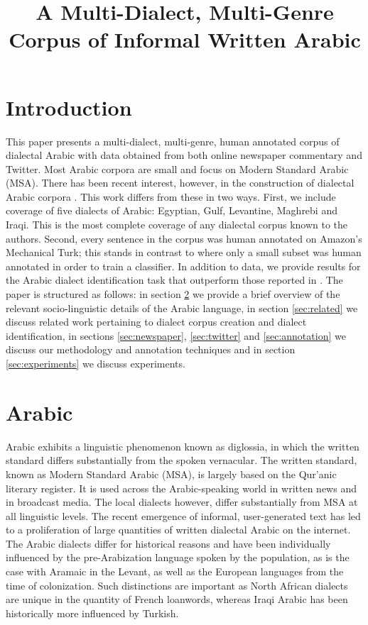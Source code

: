 \documentclass[10pt, a4paper]{article}
\title{A Multi-Dialect, Multi-Genre Corpus of Informal Written Arabic}
\begin{document}
\maketitleabstract

\section{Introduction}
This paper presents a multi-dialect, multi-genre, human annotated
corpus of dialectal Arabic with data obtained from both online newspaper
commentary and Twitter. Most Arabic corpora are small and focus on
Modern Standard Arabic (MSA). There has been recent interest, however,
in the construction of dialectal Arabic corpora
\cite{zaidan2011arabic,al2012yadac} . This work differs from these in
two ways. First, we include coverage of five dialects of Arabic:
Egyptian, Gulf, Levantine, Maghrebi and Iraqi. This is the most
complete coverage of any dialectal corpus known to the
authors. Second, every sentence in the corpus was human annotated on
Amazon's Mechanical Turk; this stands in contrast to
 where only a small subset was human annotated in
order to train a classifier. In addition to data, we provide results for
the Arabic dialect identification task that outperform those reported in
. The paper is structured as follows:
in section \ref{sec:arabic} we provide a brief overview of the
relevant socio-linguistic details of the Arabic language, in section
\ref{sec:related} we discuss related work pertaining to dialect corpus
creation and dialect identification, in sections
\ref{sec:newspaper}, \ref{sec:twitter} and \ref{sec:annotation} we discuss our 
methodology and
annotation techniques and in section \ref{sec:experiments} 
we discuss experiments.


\section{Arabic}\label{sec:arabic}
Arabic exhibits a linguistic phenomenon known as diglossia, in which
the written standard differs substantially from the spoken
vernacular. The written standard, known as Modern Standard Arabic
(MSA), is largely based on the Qur'anic literary register. It is used
across the Arabic-speaking world in written news and in broadcast media. The
local dialects however, differ substantially from MSA at all
linguistic levels. The recent emergence of informal, user-generated
text has led to a proliferation of large quantities of written
dialectal Arabic on the internet. The Arabic dialects differ for
historical reasons and have been individually influenced by the
pre-Arabization language spoken by the population, as is the case with
Aramaic in the Levant, as well as the European languages from the time
of colonization. Such distinctions are important as North African
dialects are unique in the quantity of French loanwords, whereas Iraqi
Arabic has been historically more influenced by Turkish.
\end{document}

